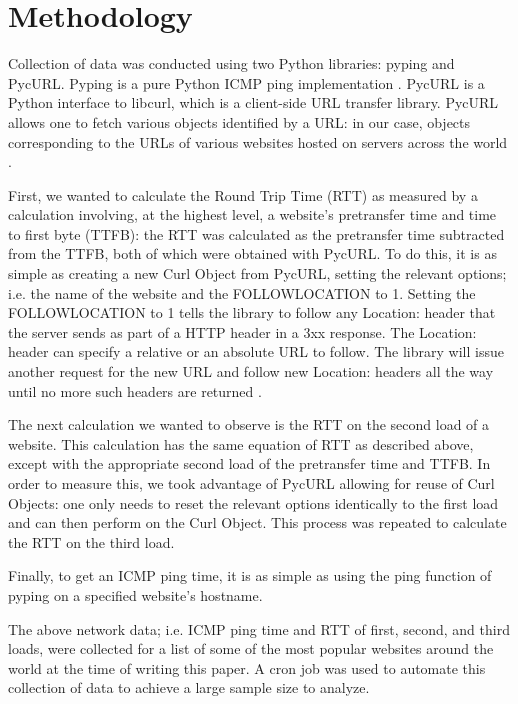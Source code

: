 \documentclass[twocolumn, 10pt, conference]{IEEEtran}
\begin{document}
\section{Methodology}
\label{sec:methodology}


Collection of data was conducted using two Python libraries: pyping and PycURL. Pyping is a pure Python ICMP ping implementation \cite{pypingdocs}. PycURL is a Python interface to libcurl, which is a client-side URL transfer library. PycURL allows one to fetch various objects identified by a URL: in our case, objects corresponding to the URLs of various websites hosted on servers across the world \cite{pycurldocs}.

First, we wanted to calculate the Round Trip Time (RTT) as measured by a calculation involving, at the highest level, a website's pretransfer time and time to first byte (TTFB): the RTT was calculated as the pretransfer time subtracted from the TTFB, both of which were obtained with PycURL. To do this, it is as simple as creating a new Curl Object from PycURL, setting the relevant options; i.e. the name of the website and the FOLLOWLOCATION to 1. Setting the FOLLOWLOCATION to 1 tells the library to follow any Location: header that the server sends as part of a HTTP header in a 3xx response. The Location: header can specify a relative or an absolute URL to follow. The library will issue another request for the new URL and follow new Location: headers all the way until no more such headers are returned \cite{curloptfollowlocationdocs}.

The next calculation we wanted to observe is the RTT on the second load of a website. This calculation has the same equation of RTT as described above, except with the appropriate second load of the pretransfer time and TTFB. In order to measure this, we took advantage of PycURL allowing for reuse of Curl Objects: one only needs to reset the relevant options identically to the first load and can then perform on the Curl Object. This process was repeated to calculate the RTT on the third load.

Finally, to get an ICMP ping time, it is as simple as using the ping function of pyping on a specified website's hostname.

The above network data; i.e. ICMP ping time and RTT of first, second, and third loads, were collected for a list of some of the most popular websites around the world at the time of writing this paper. A cron job was used to automate this collection of data to achieve a large sample size to analyze.
\end{document}

